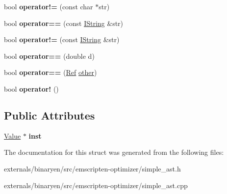 \begin{DoxyCompactItemize}
\mbox{\label{structcashew_1_1_ref_a7943a8520004413cab725e0b2739a994}} 
bool {\bfseries operator!=} (const char $\ast$str)
\item 
\mbox{\label{structcashew_1_1_ref_ac48006de01f2700c015d45dbcf957434}} 
bool {\bfseries operator==} (const \mbox{\hyperlink{structcashew_1_1_i_string}{I\+String}} \&str)
\item 
\mbox{\label{structcashew_1_1_ref_a598ff24b7526d561f43bc5467cf51270}} 
bool {\bfseries operator!=} (const \mbox{\hyperlink{structcashew_1_1_i_string}{I\+String}} \&str)
\item 
\mbox{\label{structcashew_1_1_ref_a8eab71337f1b8b328d35cd7e6e248a37}} 
bool {\bfseries operator==} (double d)
\item 
\mbox{\label{structcashew_1_1_ref_afd0276fccc504260c9ff0b18fabfdeae}} 
bool {\bfseries operator==} (\mbox{\hyperlink{structcashew_1_1_ref}{Ref}} \mbox{\hyperlink{structother}{other}})
\item 
\mbox{\label{structcashew_1_1_ref_ab0ca300ad46f0357ab88cb58e6b18f94}} 
bool {\bfseries operator!} ()
\end{DoxyCompactItemize}
\subsection*{Public Attributes}
\begin{DoxyCompactItemize}
\item 
\mbox{\label{structcashew_1_1_ref_a5a3750d139bf544319217a76a836ddce}} 
\mbox{\hyperlink{structcashew_1_1_value}{Value}} $\ast$ {\bfseries inst}
\end{DoxyCompactItemize}


The documentation for this struct was generated from the following files\+:\begin{DoxyCompactItemize}
\item 
externals/binaryen/src/emscripten-\/optimizer/simple\+\_\+ast.\+h\item 
externals/binaryen/src/emscripten-\/optimizer/simple\+\_\+ast.\+cpp\end{DoxyCompactItemize}
